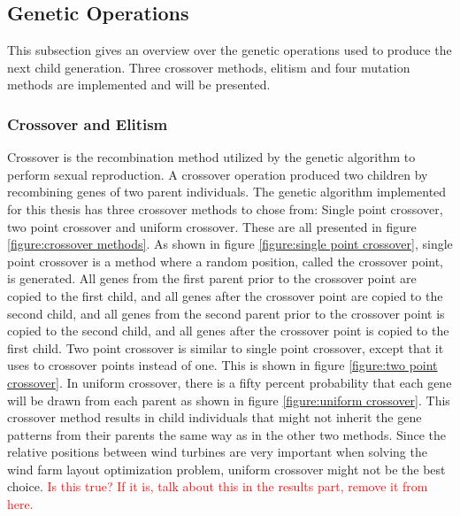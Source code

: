 \subsection{Genetic Operations}\label{subsection:genetic operations}
This subsection gives an overview over the genetic operations used to produce the next child generation. Three crossover methods, elitism and four mutation methods are implemented and will be presented. 


\subsubsection{Crossover and Elitism}
Crossover is the recombination method utilized by the genetic algorithm to perform sexual reproduction. A crossover operation produced two children by recombining genes of two parent individuals. The genetic algorithm implemented for this thesis has three crossover methods to chose from: Single point crossover, two point crossover and uniform crossover. These are all presented in figure \ref{figure:crossover methods}. As shown in figure \ref{figure:single point crossover}, single point crossover is a method where a random position, called the crossover point, is generated. All genes from the first parent prior to the crossover point are copied to the first child, and all genes after the crossover point are copied to the second child, and all genes from the second parent prior to the crossover point is copied to the second child, and all genes after the crossover point is copied to the first child. Two point crossover is similar to single point crossover, except that it uses to crossover points instead of one. This is shown in figure \ref{figure:two point crossover}. In uniform crossover, there is a fifty percent probability that each gene will be drawn from each parent as shown in figure \ref{figure:uniform crossover}. This crossover method results in child individuals that might not inherit the gene patterns from their parents the same way as in the other two methods. Since the relative positions between wind turbines are very important when solving the wind farm layout optimization problem, uniform crossover might not be the best choice. \textcolor{red}{Is this true? If it is, talk about this in the results part, remove it from here.}


